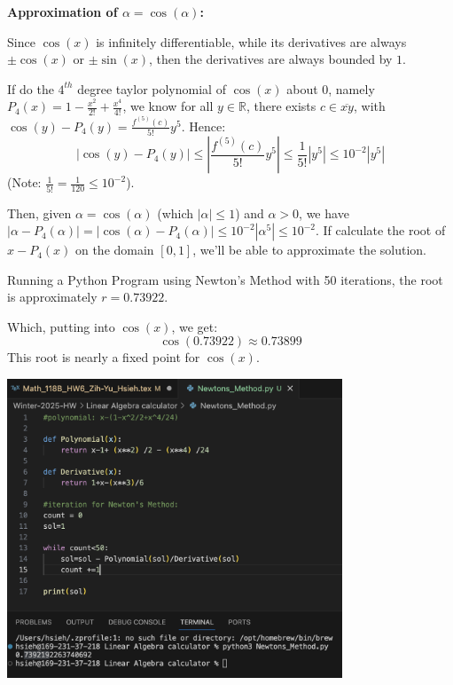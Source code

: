 \documentclass{article}
\begin{document}
\hfil

\textbf{Approximation of $\alpha=\cos(\alpha)$:}

Since $\cos(x)$ is infinitely differentiable, while its derivatives are always $\pm\cos(x)$ or $\pm\sin(x)$, then the derivatives are always bounded by $1$.

If do the $4^{th}$ degree taylor polynomial of $\cos(x)$ about $0$, namely $P_4(x)=1-\frac{x^2}{2!}+\frac{x^4}{4!}$, we know for all $y\in\mathbb{R}$,
there exists $c\in \overline{xy}$, with $\cos(y)-P_4(y)=\frac{f^{(5)}(c)}{5!}y^5$. Hence:
$$|\cos(y)-P_4(y)| \leq \left|\frac{f^{(5)}(c)}{5!}y^5\right| \leq \frac{1}{5!}|y^5| \leq 10^{-2}|y^5|$$
(Note: $\frac{1}{5!}=\frac{1}{120}\leq 10^{-2}$).

Then, given $\alpha=\cos(\alpha)$ (which $|\alpha|\leq 1$) and $\alpha>0$, we have $|\alpha-P_4(\alpha)| = |\cos(\alpha)-P_4(\alpha)| \leq 10^{-2}|\alpha^5| \leq 10^{-2}$.
If calculate the root of $x-P_4(x)$ on the domain $[0,1]$, we'll be able to approximate the solution.

Running a Python Program using Newton's Method with 50 iterations, the root is approximately $r=0.73922$.

Which, putting into $\cos(x)$, we get:
$$\cos(0.73922)\approx 0.73899$$
This root is nearly a fixed point for $\cos(x)$.

\begin{center}
    \includegraphics*[width=100mm]{newtons method.png}
\end{center}


\break
\end{document}
